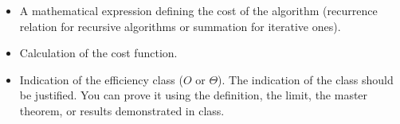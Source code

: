 \documentclass{article}
\begin{document}
\begin{itemize}
    \item A mathematical expression defining the cost of the algorithm (recurrence relation for recursive algorithms or summation for iterative ones).
    \item Calculation of the cost function.
    \item Indication of the efficiency class ($O$ or $\Theta$). The indication of the class should be justified. You can prove it using the definition, the limit, the master theorem, or results demonstrated in class.
\end{itemize}

%
\end{document}
